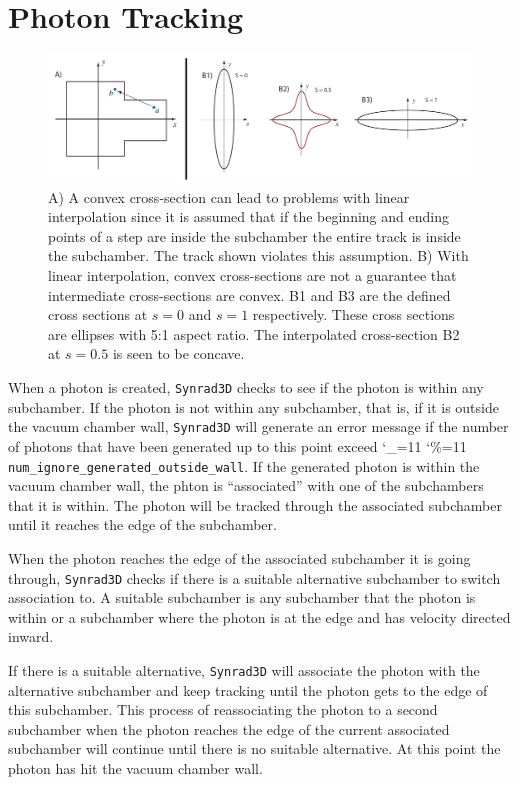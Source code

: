 \documentclass[11pt,openany]{report}
\newcommand{\srthree}{\texttt{Synrad3D}\xspace}
\newcommand\ttcmd{\begingroup\catcode`\_=11 \catcode`\%=11 \dottcmd}
\newcommand\dottcmd[1]{\texttt{#1}\endgroup}
\newcommand{\vn}{\ttcmd}
\begin{document}
\section{Photon Tracking}
\label{s:track}

\begin{figure}[tb]
\begin{center}
\includegraphics[width=6in]{chamber-problem.pdf} \caption{A) A convex cross-section can
lead to problems with linear interpolation since it is assumed that if the beginning and
ending points of a step are inside the subchamber the entire track is inside the
subchamber. The track shown violates this assumption.  B) With linear interpolation,
convex cross-sections are not a guarantee that intermediate cross-sections are convex. B1
and B3 are the defined cross sections at $s = 0$ and $s = 1$ respectively. These cross
sections are ellipses with 5:1 aspect ratio. The interpolated cross-section B2 at $s =
0.5$ is seen to be concave.}  \label{f:convex-chamber}
\end{center}
\end{figure}

When a photon is created, \srthree checks to see if the photon is within any
subchamber. If the photon is not within any subchamber, that is, if it is outside the
vacuum chamber wall, \srthree will generate an error message if the number of photons that
have been generated up to this point exceed \vn{num_ignore_generated_outside_wall}. If
the generated photon is within the vacuum chamber wall, the phton is ``associated'' with
one of the subchambers that it is within.  The photon will be tracked through the
associated subchamber until it reaches the edge of the subchamber.

When the photon reaches the edge of the associated subchamber it is going through,
\srthree checks if there is a suitable alternative subchamber to switch association to. A
suitable subchamber is any subchamber that the photon is within or a subchamber where the
photon is at the edge and has velocity directed inward.

If there is a suitable alternative, \srthree will associate the photon with the
alternative subchamber and keep tracking until the photon gets to the edge of this
subchamber.  This process of reassociating the photon to a second subchamber when the
photon reaches the edge of the current associated subchamber will continue until there is
no suitable alternative. At this point the photon has hit the vacuum chamber wall.
\end{document}
